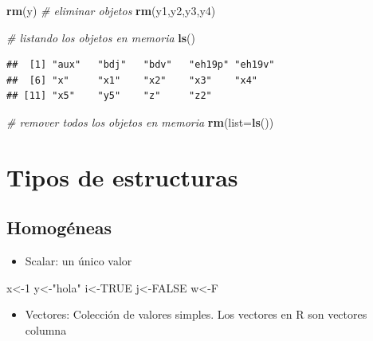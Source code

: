 \documentclass[
]{book}
\newenvironment{Shaded}{\begin{snugshade}}{\end{snugshade}}
\newcommand{\CommentTok}[1]{\textcolor[rgb]{0.56,0.35,0.01}{\textit{#1}}}
\newcommand{\DataTypeTok}[1]{\textcolor[rgb]{0.13,0.29,0.53}{#1}}
\newcommand{\DecValTok}[1]{\textcolor[rgb]{0.00,0.00,0.81}{#1}}
\newcommand{\KeywordTok}[1]{\textcolor[rgb]{0.13,0.29,0.53}{\textbf{#1}}}
\newcommand{\NormalTok}[1]{#1}
\newcommand{\OtherTok}[1]{\textcolor[rgb]{0.56,0.35,0.01}{#1}}
\newcommand{\StringTok}[1]{\textcolor[rgb]{0.31,0.60,0.02}{#1}}
\providecommand{\tightlist}{%
  \setlength{\itemsep}{0pt}\setlength{\parskip}{0pt}}
\begin{document}
\begin{Shaded}
\begin{Highlighting}[]
\KeywordTok{rm}\NormalTok{(y) }\CommentTok{# eliminar objetos}
\KeywordTok{rm}\NormalTok{(y1,y2,y3,y4)}

\CommentTok{# listando los objetos en memoria}
\KeywordTok{ls}\NormalTok{()}
\end{Highlighting}
\end{Shaded}

\begin{verbatim}
##  [1] "aux"   "bdj"   "bdv"   "eh19p" "eh19v"
##  [6] "x"     "x1"    "x2"    "x3"    "x4"   
## [11] "x5"    "y5"    "z"     "z2"
\end{verbatim}

\begin{Shaded}
\begin{Highlighting}[]
\CommentTok{# remover todos los objetos en memoria}
\KeywordTok{rm}\NormalTok{(}\DataTypeTok{list=}\KeywordTok{ls}\NormalTok{())}
\end{Highlighting}
\end{Shaded}

\hypertarget{tipos-de-estructuras}{%
\section{Tipos de estructuras}\label{tipos-de-estructuras}}

\hypertarget{homoguxe9neas}{%
\subsection{Homogéneas}\label{homoguxe9neas}}

\begin{itemize}
\tightlist
\item
  Scalar: un único valor
\end{itemize}

\begin{Shaded}
\begin{Highlighting}[]
\NormalTok{x<-}\DecValTok{1}
\NormalTok{y<-}\StringTok{"hola"}
\NormalTok{i<-}\OtherTok{TRUE}
\NormalTok{j<-}\OtherTok{FALSE}
\NormalTok{w<-F}
\end{Highlighting}
\end{Shaded}

\begin{itemize}
\tightlist
\item
  Vectores: Colección de valores simples. Los vectores en R son vectores columna
\end{itemize}
\end{document}
